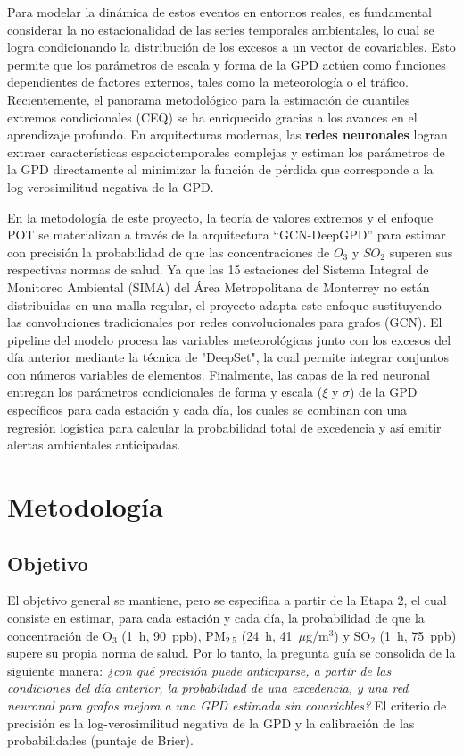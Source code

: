 \documentclass[11pt]{article}
\begin{document}
Para modelar la dinámica de estos eventos en entornos reales, es fundamental considerar la no estacionalidad de las series temporales ambientales, lo cual se logra condicionando la distribución de los excesos a un vector de covariables. Esto permite que los parámetros de escala y forma de la GPD actúen como funciones dependientes de factores externos, tales como la meteorología o el tráfico. Recientemente, el panorama metodológico para la estimación de cuantiles extremos condicionales (CEQ) se ha enriquecido gracias a los avances en el aprendizaje profundo. En arquitecturas modernas, las \textbf{redes neuronales} logran extraer características espaciotemporales complejas y estiman los parámetros de la GPD directamente al minimizar la función de pérdida que corresponde a la log-verosimilitud negativa de la GPD.

En la metodología de este proyecto, la teoría de valores extremos y el enfoque POT se materializan a través de la arquitectura ``GCN-DeepGPD'' para estimar con precisión la probabilidad de que las concentraciones de $O_3$ y $SO_2$ superen sus respectivas normas de salud. Ya que las 15 estaciones del Sistema Integral de Monitoreo Ambiental (SIMA) del Área Metropolitana de Monterrey no están distribuidas en una malla regular, el proyecto adapta este enfoque sustituyendo las convoluciones tradicionales por redes convolucionales para grafos (GCN). El pipeline del modelo procesa las variables meteorológicas junto con los excesos del día anterior mediante la técnica de "DeepSet", la cual permite integrar conjuntos con números variables de elementos. Finalmente, las capas de la red neuronal entregan los parámetros condicionales de forma y escala ($\xi$ y $\sigma$) de la GPD específicos para cada estación y cada día, los cuales se combinan con una regresión logística para calcular la probabilidad total de excedencia y así emitir alertas ambientales anticipadas.

\section{Metodología} %

\subsection{Objetivo}
El objetivo general se mantiene, pero se especifica a partir de la Etapa 2, el cual consiste en estimar, para cada estación y cada día, la probabilidad de que la concentración de O$_3$ (1~h, 90~ppb), PM$_{2.5}$ (24~h, 41~$\mu$g/m$^3$) y SO$_2$ (1~h, 75~ppb) supere su propia norma de salud. Por lo tanto, la pregunta guía se consolida de la siguiente manera:  \emph{¿con qué precisión puede anticiparse, a partir de las condiciones del día anterior, la probabilidad de una excedencia, y una red neuronal para grafos mejora a una GPD estimada sin covariables?} El criterio de precisión es la log-verosimilitud negativa de la GPD y la calibración de las probabilidades (puntaje de Brier).
\end{document}
